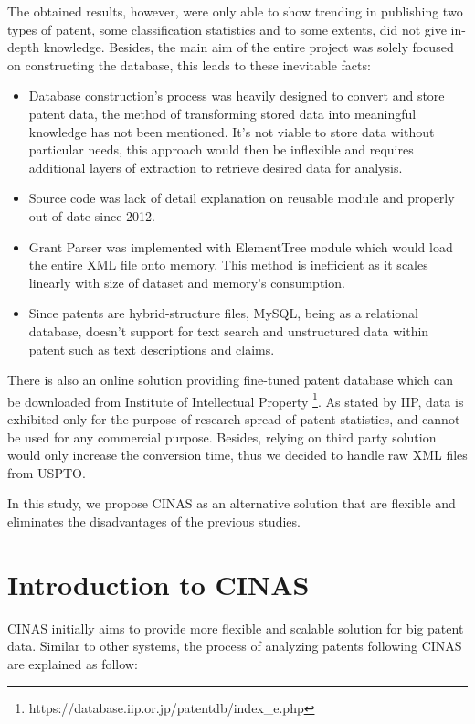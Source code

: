 \documentclass{sig-alternate}
\begin{document}
{The obtained results, however, were only able to show trending in publishing two types of patent, some classification statistics and to some extents, did not give in-depth knowledge. Besides, the main aim of the entire project was solely focused on constructing the database, this leads to these inevitable facts:

\begin{itemize}
\item Database construction's process was heavily designed to convert and store patent data, the method of transforming stored data into meaningful knowledge has not been mentioned. It's not viable to store data without particular needs, this approach would then be inflexible and requires additional layers of extraction to retrieve desired data for analysis.
\item Source code was lack of detail explanation on reusable module and properly out-of-date since 2012.
\item Grant Parser was implemented with ElementTree module which would load the entire XML file onto memory. This method is inefficient as it scales linearly with size of dataset and memory's consumption.
\item Since patents are hybrid-structure files, MySQL, being as a relational database, doesn't support for text search and unstructured data within patent such as text descriptions and claims. 
\end{itemize}

There is also an online solution providing fine-tuned patent database which can be downloaded from Institute of Intellectual Property \footnote{https://database.iip.or.jp/patentdb/index\_e.php}. As stated by IIP, data is exhibited only for the purpose of research spread of patent statistics, and cannot be used for any commercial purpose. Besides, relying on third party solution would only increase the conversion time, thus we decided to handle raw XML files from USPTO.

In this study, we propose CINAS as an alternative solution that are flexible and eliminates the disadvantages of the previous studies.

\section{Introduction to CINAS}
CINAS initially aims to provide more flexible and scalable solution for big patent data. Similar to other systems, the process of analyzing patents following CINAS are explained as follow:

}
\end{document}
